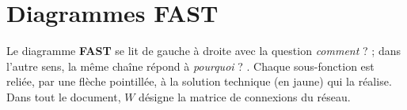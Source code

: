 \documentclass{report}
\title{\DocName}
\author{\DocAuthors}
\date{\textbf{JUNIA - ISEN - AP4} \url{https://github.com/CharlesBta/Modele-Neuronaux-RD.git}}
\begin{document}
\maketitle

\tableofcontents

\chapter{Diagrammes FAST}

Le diagramme \textbf{FAST} se lit de gauche à droite avec la question \og \emph{comment} ? \fg{} ; dans l'autre sens, la même chaîne répond à \og \emph{pourquoi} ? \fg. Chaque sous-fonction est reliée, par une flèche pointillée, à la solution technique (en jaune) qui la réalise. Dans tout le document, $W$ désigne la matrice de connexions du réseau.

\end{document}
